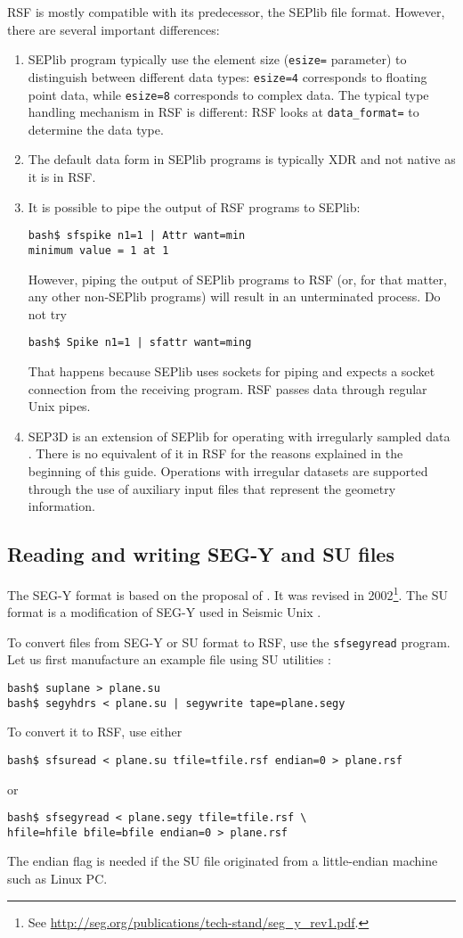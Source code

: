 RSF is mostly compatible with its predecessor, the SEPlib file format.
However, there are several important differences:
\begin{enumerate}
\item SEPlib program typically use the element size (\texttt{esize=}
parameter) to distinguish between different data types:
\texttt{esize=4} corresponds to floating point data, while
\texttt{esize=8} corresponds to complex data. The typical type
handling mechanism in RSF is different: RSF looks at
\texttt{data\_format=} to determine the data type.
\item The default data form in SEPlib programs is
typically XDR and not native as it is in RSF. 
\item It is possible to pipe the
output of RSF programs to SEPlib:
\begin{verbatim}
bash$ sfspike n1=1 | Attr want=min
minimum value = 1 at 1
\end{verbatim}
However, piping the output of SEPlib programs to RSF (or, for that matter, any
other non-SEPlib programs) will result in an unterminated process. Do not try
\begin{verbatim}
bash$ Spike n1=1 | sfattr want=ming
\end{verbatim}
That happens because SEPlib uses sockets for piping and expects a socket
connection from the receiving program. RSF passes data through regular Unix
pipes.
\item SEP3D is an extension of SEPlib for operating with irregularly sampled
  data \cite[]{Biondi.sep.92.343}. There is no equivalent of it in RSF for
  the reasons explained in the beginning of this guide. Operations with
  irregular datasets are supported through the use of auxiliary input files
  that represent the geometry information.
\end{enumerate}

\subsection{Reading and writing SEG-Y and SU files}

The SEG-Y format is based on the proposal of \cite{GEO40-02-03440352}.
It was revised in 2002\footnote{See \url{http://seg.org/publications/tech-stand/seg_y_rev1.pdf}.}. The
SU format is a modification of SEG-Y used in Seismic Unix
\cite[]{TLE16-07-10451049}.

To convert files from SEG-Y or SU format to RSF, use the \texttt{sfsegyread}
program. Let us first manufacture an example file using SU utilities
\cite[]{su}:
\begin{verbatim}
bash$ suplane > plane.su
bash$ segyhdrs < plane.su | segywrite tape=plane.segy
\end{verbatim}
To convert it to RSF, use either
\begin{verbatim}
bash$ sfsuread < plane.su tfile=tfile.rsf endian=0 > plane.rsf
\end{verbatim}
or
\begin{verbatim}
bash$ sfsegyread < plane.segy tfile=tfile.rsf \
hfile=hfile bfile=bfile endian=0 > plane.rsf
\end{verbatim}
The endian flag is needed if the SU file originated from a little-endian
machine such as Linux PC.

